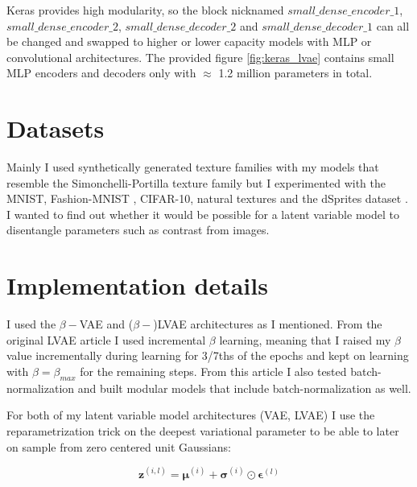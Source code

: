\documentclass[11pt, english]{article}
\begin{document}
\vspace{3mm}

\par Keras provides high modularity, so the block nicknamed $small\_dense\_encoder\_1$, $small\_dense\_encoder\_2$, $small\_dense\_decoder\_2$ and $small\_dense\_decoder\_1$ can all be
changed and swapped to higher or lower capacity models with MLP or convolutional architectures. The provided figure \ref{fig:keras_lvae} contains small MLP encoders and decoders only with $\approx$ 1.2 million parameters in total.

\section{Datasets}

\par Mainly I used synthetically generated texture families with my models that resemble the Simonchelli-Portilla texture family \cite{portilla2003image} but I experimented with the MNIST, Fashion-MNIST \cite{xiao2017fashion}, CIFAR-10, natural textures and the dSprites dataset \cite{matthey2017dsprites}. I wanted to find out whether it would be possible for a latent variable model to disentangle parameters such as contrast from images.

\section{Implementation details}

\par I used the $\beta-$VAE and ($\beta-$)LVAE architectures as I mentioned. From the original LVAE article \cite{sonderby2016ladder} I used incremental $\beta$ learning, meaning that I raised my $\beta$ value incrementally during learning for 3/7ths of the epochs and kept on learning with $\beta = \beta_{max}$ for the remaining steps. From this article I also tested batch-normalization and built modular models that include batch-normalization as well.

\vspace{3mm}

\par For both of my latent variable model architectures (VAE, LVAE) I use the reparametrization trick on the deepest variational parameter to be able to later on sample from zero centered unit Gaussians:

\vspace{3mm}

\begin{equation}
    \boldsymbol{\bm{z}}^{(i, l)} = \boldsymbol{\mu}^{(i)} + \boldsymbol{\sigma}^{(i)} \odot \boldsymbol{\bm{\epsilon}}^{(l)}
\end{equation}
\end{document}
